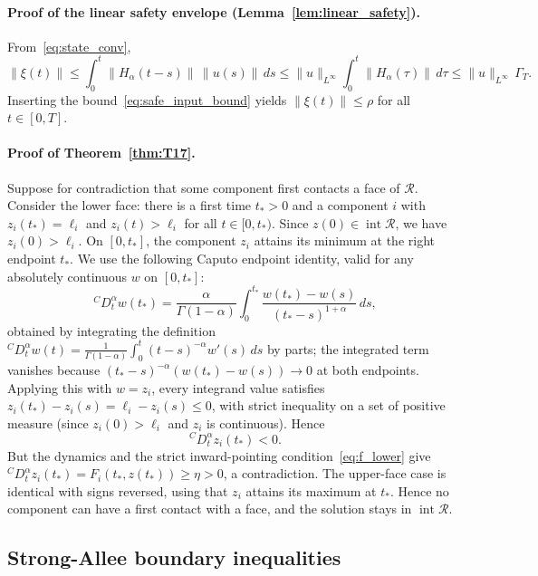 \paragraph{Proof of the linear safety envelope (Lemma~\ref{lem:linear_safety}).}
From~\eqref{eq:state_conv},
\[
\|\xi(t)\| \le \int_0^t \|H_\alpha(t - s)\|\,\|u(s)\|\, ds
\le \|u\|_{L^\infty} \int_0^t \|H_\alpha(\tau)\|\, d\tau
\le \|u\|_{L^\infty} \,\Gamma_T.
\]
Inserting the bound~\eqref{eq:safe_input_bound} yields \(\|\xi(t)\| \le \rho\) for all \(t \in [0, T]\).

\paragraph{Proof of Theorem~\ref{thm:T17}.}
Suppose for contradiction that some component first contacts a face of \(\mathcal{R}\). Consider the lower face: there is a first time \(t_* > 0\) and a component \(i\) with \(z_i(t_*) = \ell_i\) and \(z_i(t) > \ell_i\) for all \(t \in [0, t_*)\). Since \(z(0) \in \operatorname{int}\mathcal{R}\), we have \(z_i(0) > \ell_i\). On \([0, t_*]\), the component \(z_i\) attains its minimum at the right endpoint \(t_*\). We use the following Caputo endpoint identity, valid for any absolutely continuous \(w\) on \([0,t_*]\):
\[
{}^C D_t^\alpha w(t_*)
= \frac{\alpha}{\Gamma(1-\alpha)} \int_0^{t_*} \frac{w(t_*) - w(s)}{(t_* - s)^{1+\alpha}}\, ds,
\]
obtained by integrating the definition \({}^C D_t^\alpha w(t) = \frac{1}{\Gamma(1-\alpha)}\int_0^t (t-s)^{-\alpha} w'(s)\,ds\) by parts; the integrated term vanishes because \((t_* - s)^{-\alpha}(w(t_*) - w(s)) \to 0\) at both endpoints. Applying this with \(w = z_i\), every integrand value satisfies \(z_i(t_*) - z_i(s) = \ell_i - z_i(s) \le 0\), with strict inequality on a set of positive measure (since \(z_i(0) > \ell_i\) and \(z_i\) is continuous). Hence
\[
{}^C D_t^\alpha z_i(t_*) < 0.
\]
But the dynamics and the strict inward-pointing condition~\eqref{eq:f_lower} give \({}^C D_t^\alpha z_i(t_*) = F_i(t_*, z(t_*)) \ge \eta > 0\), a contradiction. The upper-face case is identical with signs reversed, using that \(z_i\) attains its maximum at \(t_*\). Hence no component can have a first contact with a face, and the solution stays in \(\operatorname{int}\mathcal{R}\).

\subsection{Strong-Allee boundary inequalities}

